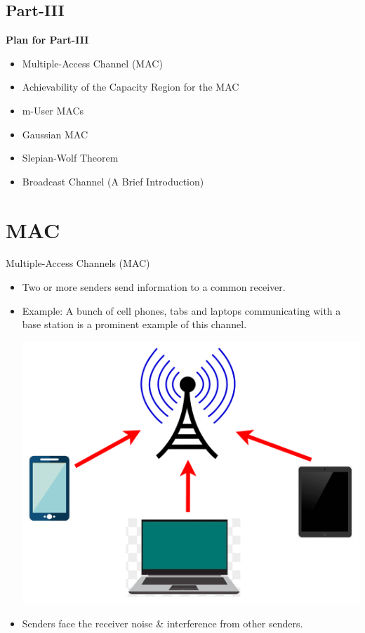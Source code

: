 \documentclass{beamer}
\newcommand{\green}[1]{{\color{ForestGreen} #1}}
\begin{document}
{\small
\begin{frame}

\subsection{Part-III}

\textbf{Plan for Part-III}
\begin{itemize}
    \item Multiple-Access Channel (MAC)
    \item Achievability of the Capacity Region for the MAC
    \item m-User MACs
    \item Gaussian MAC
    \item Slepian-Wolf Theorem
    \item Broadcast Channel (A Brief Introduction)
\end{itemize}
%
\end{frame}

\section{MAC}

\begin{frame}{Multiple-Access Channels (MAC)}
 \begin{itemize}
	\justifying

\item<1-> Two or more senders send information to a common receiver. 
\item<2-> \green{Example:} A bunch of cell phones, tabs and laptops communicating with a base station is a prominent example of this channel. \\
\begin{center}
    \includegraphics[scale=0.05]{Presentation Diagrams/MAC.png}
\end{center}
%
\item<3-> Senders face the receiver noise \& interference from other senders.  


\end{itemize}
\end{frame}}
\end{document}
